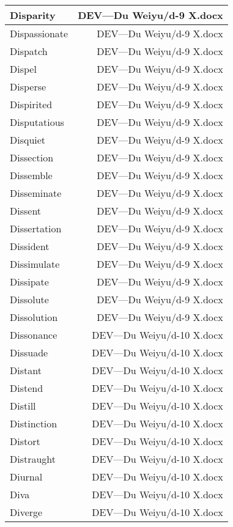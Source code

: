 \documentclass{article}
\begin{document}
\begin{center}
\begin{longtable}{|l|r|}
\hline
Disparity  &  DEV---Du Weiyu/d-9 X.docx\\  
\hline
Dispassionate  &  DEV---Du Weiyu/d-9 X.docx\\  
\hline
Dispatch  &  DEV---Du Weiyu/d-9 X.docx\\  
\hline
Dispel  &  DEV---Du Weiyu/d-9 X.docx\\  
\hline
Disperse  &  DEV---Du Weiyu/d-9 X.docx\\  
\hline
Dispirited  &  DEV---Du Weiyu/d-9 X.docx\\  
\hline
Disputatious  &  DEV---Du Weiyu/d-9 X.docx\\  
\hline
Disquiet  &  DEV---Du Weiyu/d-9 X.docx\\  
\hline
Dissection  &  DEV---Du Weiyu/d-9 X.docx\\  
\hline
Dissemble  &  DEV---Du Weiyu/d-9 X.docx\\  
\hline
Disseminate  &  DEV---Du Weiyu/d-9 X.docx\\  
\hline
Dissent  &  DEV---Du Weiyu/d-9 X.docx\\  
\hline
Dissertation  &  DEV---Du Weiyu/d-9 X.docx\\  
\hline
Dissident  &  DEV---Du Weiyu/d-9 X.docx\\  
\hline
Dissimulate  &  DEV---Du Weiyu/d-9 X.docx\\  
\hline
Dissipate  &  DEV---Du Weiyu/d-9 X.docx\\  
\hline
Dissolute  &  DEV---Du Weiyu/d-9 X.docx\\  
\hline
Dissolution  &  DEV---Du Weiyu/d-9 X.docx\\  
\hline
Dissonance  &  DEV---Du Weiyu/d-10 X.docx\\  
\hline
Dissuade  &  DEV---Du Weiyu/d-10 X.docx\\  
\hline
Distant  &  DEV---Du Weiyu/d-10 X.docx\\  
\hline
Distend  &  DEV---Du Weiyu/d-10 X.docx\\  
\hline
Distill  &  DEV---Du Weiyu/d-10 X.docx\\  
\hline
Distinction  &  DEV---Du Weiyu/d-10 X.docx\\  
\hline
Distort  &  DEV---Du Weiyu/d-10 X.docx\\  
\hline
Distraught  &  DEV---Du Weiyu/d-10 X.docx\\  
\hline
Diurnal  &  DEV---Du Weiyu/d-10 X.docx\\  
\hline
Diva  &  DEV---Du Weiyu/d-10 X.docx\\  
\hline
Diverge  &  DEV---Du Weiyu/d-10 X.docx\\  

\end{longtable}
\end{center}
\end{document}
